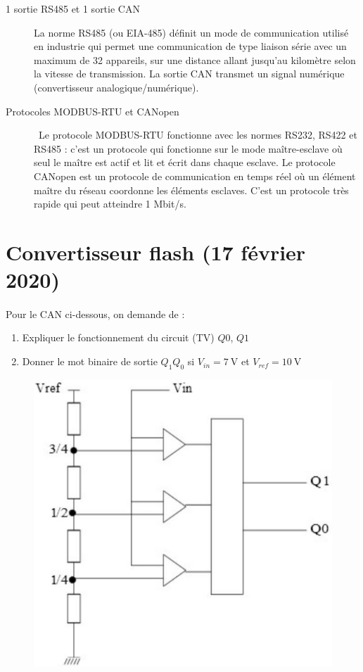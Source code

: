 \documentclass{article}
\begin{document}
\begin{description}
    \item[1 sortie RS485 et 1 sortie CAN] La norme RS485 (ou EIA-485) définit un mode de communication utilisé en industrie qui permet une communication de type liaison série avec un maximum de 32 appareils, sur une distance allant jusqu'au kilomètre selon la vitesse de transmission. La sortie CAN transmet un signal numérique (convertisseur analogique/numérique).
    \item[Protocoles MODBUS-RTU et CANopen]\ Le protocole MODBUS-RTU fonctionne avec les normes RS232, RS422 et RS485 : c'est un protocole qui fonctionne sur le mode maître-esclave où seul le maître est actif et lit et écrit dans chaque esclave. Le protocole CANopen est un protocole de communication en temps réel où un élément maître du réseau coordonne les éléments esclaves. C'est un protocole très rapide qui peut atteindre 1 Mbit/s.
\end{description}

\newpage
\section{Convertisseur flash (17 février 2020)}
\paragraph{}
Pour le CAN ci-dessous, on demande de :
\begin{enumerate}
    \item Expliquer le fonctionnement du circuit (TV) $Q0$, $Q1$
    \item Donner le mot binaire de sortie $Q_1Q_0$ si $V_{in} = \SI{7}{\volt}$ et $V_{ref} = \SI{10}{\volt}$
\end{enumerate}
\begin{figure}[H]
    \centering
    \includegraphics[width=.5\linewidth]{images/convertisseur-flash.png}
\end{figure}
\end{document}
